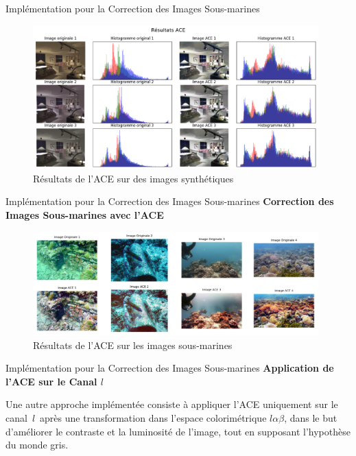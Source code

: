 \documentclass[8pt,a4paper]{beamer}
\numberwithin{figure}{section}
\begin{document}
\begin{frame}{Implémentation pour la Correction des Images Sous-marines}
\begin{figure}[h]
\begin{center}
\includegraphics[width=11cm]{image001.png}
\end{center}
\label{figure4.2}
\caption{Résultats de l'ACE sur des images synthétiques}
\end{figure}
\end{frame}

\begin{frame}{Implémentation pour la Correction des Images Sous-marines}
\textbf{Correction des Images Sous-marines avec l'ACE}
\vspace{3mm}
\begin{figure}[h!]
\begin{center}
\includegraphics[width=11cm]{image002.png}
\end{center}
\label{figure4.3}
\caption{Résultats de l'ACE sur les images sous-marines}
\end{figure} 
\end{frame}


\begin{frame}{Implémentation pour la Correction des Images Sous-marines}
\textbf{Application de l'ACE sur le Canal \( l \)}
\vspace{3mm}
\par Une autre approche implémentée consiste à appliquer l'ACE uniquement sur le canal $\,l\,$ après une transformation dans l'espace colorimétrique $l\alpha\beta$, dans le but d'améliorer le contraste et la luminosité de l'image, tout en supposant l'hypothèse du monde gris.
\end{frame}
\end{document}
